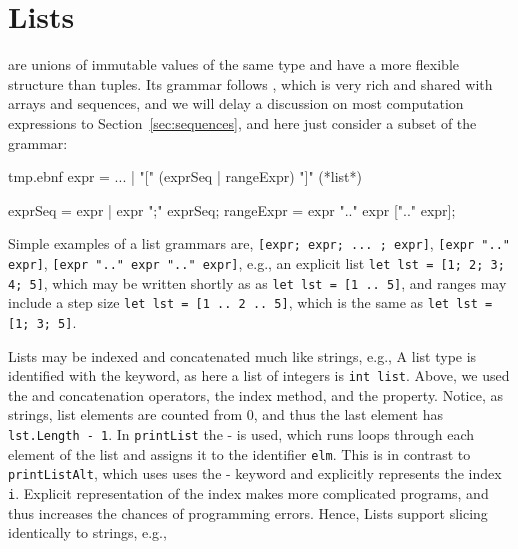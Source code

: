 \section{Lists}
 are unions of immutable values of the same type and have a more flexible structure than tuples. Its grammar follows , which is very rich and shared with arrays and sequences, and we will delay a discussion on most computation expressions to Section~\ref{sec:sequences}, and here just consider a subset of the grammar:
\begin{verbatimwrite}{tmp.ebnf}
expr = ... 
  | "[" (exprSeq | rangeExpr) "]" (*list*)

exprSeq =  expr | expr ";" exprSeq;
rangeExpr = expr ".." expr [".." expr];
\end{verbatimwrite}
Simple examples of a list grammars are, \lstinline[language=ebnf]![expr; expr; ... ; expr]!, \lstinline[language=ebnf]![expr ".." expr]!, \lstinline[language=ebnf]![expr ".." expr ".." expr]!, e.g., an explicit list \lstinline!let lst = [1; 2; 3; 4; 5]!, which may be written shortly as  as \lstinline!let lst = [1 .. 5]!, and ranges may include a step size \lstinline!let lst = [1 .. 2 .. 5]!, which is the same as \lstinline!let lst = [1; 3; 5]!.

Lists may be indexed and concatenated much like strings, e.g.,
%
%
A list type is identified with the  keyword, as here a list of integers is \lstinline!int list!. Above, we used the  and \idx{\lexeme{::}} concatenation operators, the  index method, and the  property. Notice, as strings, list elements are counted from 0, and thus the last element has \lstinline!lst.Length - 1!. In \lstinline!printList! the - is used, which runs loops through each element of the list and assigns it to the identifier \lstinline!elm!. This is in contrast to \lstinline!printListAlt!, which uses uses the - keyword and explicitly represents the index \lstinline!i!. Explicit representation of the index makes more complicated programs, and thus increases the chances of programming errors. Hence,  Lists support slicing identically to strings, e.g.,
%
%

